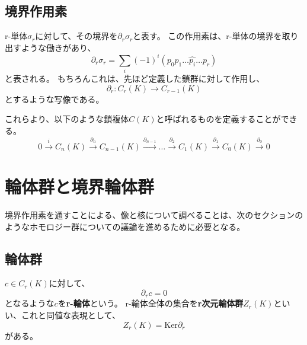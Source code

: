\documentclass[a4paper]{jsreport}
\begin{document}
            \subsection*{境界作用素}
                r-単体$\sigma_r$に対して、その境界を$\partial_r \sigma_r$と表す。
                この作用素は、r-単体の境界を取り出すような働きがあり、
                \begin{equation}
                    \partial_r \sigma_r = \sum_{i} (-1)^i (p_0p_1 \dots \hat{p_i} \dots p_r)
                \end{equation}
                と表される。
                もちろんこれは、先ほど定義した鎖群に対して作用し、
                \begin{equation}
                    \partial_r : C_r(K) \to C_{r-1}(K)
                \end{equation}
                とするような写像である。

            これらより、以下のような鎖複体$C(K)$と呼ばれるものを定義することができる。
            \begin{equation}
                0 \xrightarrow{i} C_n(K) \xrightarrow{\partial_n} C_{n-1}(K) \xrightarrow{\partial_{n-1}} \dots \xrightarrow{\partial_2} C_1(K) \xrightarrow{\partial_1} C_0(K) \xrightarrow{\partial_0} 0
            \end{equation}

        \section{輪体群と境界輪体群}
            境界作用素を通すことによる、像と核について調べることは、次のセクションのようなホモロジー群についての議論を進めるために必要となる。

            \subsection*{輪体群}
                $c \in C_r(K)$に対して、
                \begin{equation}
                    \partial_r c = 0
                \end{equation}
                となるような$c$を\textbf{r-輪体}という。
                r-輪体全体の集合を\textbf{r次元輪体群}$Z_r(K)$といい、これと同値な表現として、
                \begin{equation}
                    Z_r(K) = \text{Ker} \partial_r
                \end{equation}
                がある。
\end{document}
